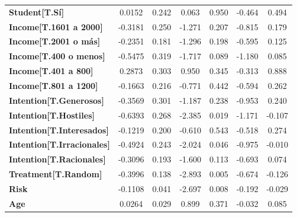\documentclass{report}
\begin{document}
\begin{center}
\begin{tabular}{lcccccc}
\textbf{Student[T.Sí]}             &       0.0152  &        0.242     &     0.063  &         0.950        &       -0.464    &        0.494     \\
\textbf{Income[T.1601 a 2000]}     &      -0.3181  &        0.250     &    -1.271  &         0.207        &       -0.815    &        0.179     \\
\textbf{Income[T.2001 o más]}      &      -0.2351  &        0.181     &    -1.296  &         0.198        &       -0.595    &        0.125     \\
\textbf{Income[T.400 o menos]}     &      -0.5475  &        0.319     &    -1.717  &         0.089        &       -1.180    &        0.085     \\
\textbf{Income[T.401 a 800]}       &       0.2873  &        0.303     &     0.950  &         0.345        &       -0.313    &        0.888     \\
\textbf{Income[T.801 a 1200]}      &      -0.1663  &        0.216     &    -0.771  &         0.442        &       -0.594    &        0.262     \\
\textbf{Intention[T.Generosos]}    &      -0.3569  &        0.301     &    -1.187  &         0.238        &       -0.953    &        0.240     \\
\textbf{Intention[T.Hostiles]}     &      -0.6393  &        0.268     &    -2.385  &         0.019        &       -1.171    &       -0.107     \\
\textbf{Intention[T.Interesados]}  &      -0.1219  &        0.200     &    -0.610  &         0.543        &       -0.518    &        0.274     \\
\textbf{Intention[T.Irracionales]} &      -0.4924  &        0.243     &    -2.024  &         0.046        &       -0.975    &       -0.010     \\
\textbf{Intention[T.Racionales]}   &      -0.3096  &        0.193     &    -1.600  &         0.113        &       -0.693    &        0.074     \\
\textbf{Treatment[T.Random]}       &      -0.3996  &        0.138     &    -2.893  &         0.005        &       -0.674    &       -0.126     \\
\textbf{Risk}                      &      -0.1108  &        0.041     &    -2.697  &         0.008        &       -0.192    &       -0.029     \\
\textbf{Age}                       &       0.0264  &        0.029     &     0.899  &         0.371        &       -0.032    &        0.085     \\

\end{tabular}
\end{center}
\end{document}
